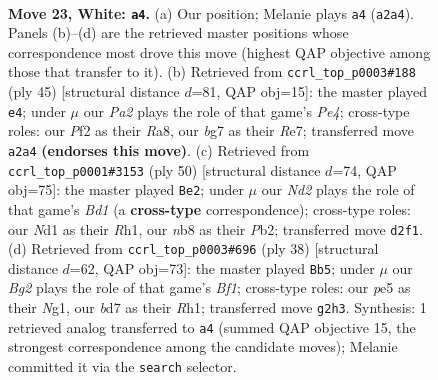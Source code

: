 \documentclass[11pt]{article}
\begin{document}
\clearpage

\begin{figure}[p]\centering
\begin{subfigure}{0.46\textwidth}\centering
\resizebox{\linewidth}{!}{%
\newchessgame
\chessboard[
  setfen={1n3rk1/r2b2b1/5n2/pPp1p3/4p1p1/1P4P1/P2NRPB1/1RBN2K1 w - - 1 23},
  showmover=false,
  pgfstyle=straightmove, color=movearrow, markmove={a2-a4}
]}
\caption{}
\end{subfigure}\hfill
\begin{subfigure}{0.46\textwidth}\centering
\resizebox{\linewidth}{!}{%
\newchessgame
\chessboard[
  setfen={r1k3b1/2p1r1b1/1pn2np1/4pp2/2P5/1PN1PP2/1B2B1P1/1KNR3R b - - 0 23},
  showmover=false,
  pgfstyle=straightmove, color=movearrow, markmove={e5-e4}
]}
\caption{}
\end{subfigure}
\\[4pt]
\begin{subfigure}{0.46\textwidth}\centering
\resizebox{\linewidth}{!}{%
\newchessgame
\chessboard[
  setfen={r2r2k1/1b1n1ppp/2p5/2n1p3/pN2P1PP/2N1KP2/PP6/2RB3R w - - 1 26},
  showmover=false,
  pgfstyle=straightmove, color=movearrow, markmove={d1-e2}
]}
\caption{}
\end{subfigure}\hfill
\begin{subfigure}{0.46\textwidth}\centering
\resizebox{\linewidth}{!}{%
\newchessgame
\chessboard[
  setfen={r1brn1k1/pp4b1/1n1P2pp/4p3/4N3/5P2/PP1B2P1/K2R1BNR w - - 0 20},
  showmover=false,
  pgfstyle=straightmove, color=movearrow, markmove={f1-b5}
]}
\caption{}
\end{subfigure}
\caption{\textbf{Move 23, White: \texttt{a4}.} (a) Our position; Melanie plays \texttt{a4} (\texttt{a2a4}). Panels (b)--(d) are the retrieved master positions whose correspondence most drove this move (highest QAP objective among those that transfer to it). (b) Retrieved from \texttt{ccrl\_top\_p0003\#188} (ply 45) [structural distance $d$=81, QAP obj=15]: the master played \texttt{e4}; under $\mu$ our \emph{Pa2} plays the role of that game's \emph{Pe4}; cross-type roles: our \emph{P}f2 as their \emph{R}a8, our \emph{b}g7 as their \emph{R}e7; transferred move \texttt{a2a4} \textbf{(endorses this move)}. (c) Retrieved from \texttt{ccrl\_top\_p0001\#3153} (ply 50) [structural distance $d$=74, QAP obj=75]: the master played \texttt{Be2}; under $\mu$ our \emph{Nd2} plays the role of that game's \emph{Bd1} (a \textbf{cross-type} correspondence); cross-type roles: our \emph{N}d1 as their \emph{R}h1, our \emph{n}b8 as their \emph{P}b2; transferred move \texttt{d2f1}. (d) Retrieved from \texttt{ccrl\_top\_p0003\#696} (ply 38) [structural distance $d$=62, QAP obj=73]: the master played \texttt{Bb5}; under $\mu$ our \emph{Bg2} plays the role of that game's \emph{Bf1}; cross-type roles: our \emph{p}e5 as their \emph{N}g1, our \emph{b}d7 as their \emph{R}h1; transferred move \texttt{g2h3}. Synthesis: 1 retrieved analog transferred to \texttt{a4} (summed QAP objective 15, the strongest correspondence among the candidate moves); Melanie committed it via the \texttt{search} selector.}
\label{fig:thought-m44}
\end{figure}
\end{document}

